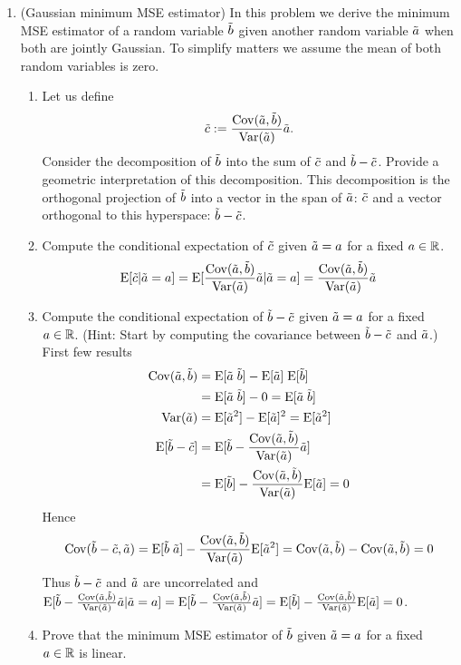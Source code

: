 \documentclass[12pt,twoside]{article}
\begin{document}
\begin{enumerate}
\item (Gaussian minimum MSE estimator) In this problem we derive the minimum MSE estimator of a random variable $\tilde{ b }$ given another random variable $\tilde{ a }$ when both are jointly Gaussian. To simplify matters we assume the mean of both random variables is zero. 
  \begin{enumerate}
  \item Let us define
  \begin{align}
  \rnd{c} := \frac{\cov(\ra,\rb)}{\var(\ra)}\ra.
  \end{align}
  Consider the decomposition of $\tilde{ b }$ into the sum of $\tilde{ c } $ and $\tilde{  b } - \tilde{ c }$. Provide a geometric interpretation of this decomposition. 
  This decomposition is the orthogonal projection of $\tilde{ b }$ into a vector in the span of $\tilde{ a }$: $\tilde{ c }$ and a vector orthogonal to this hyperspace:  $\tilde{  b } - \tilde{ c }$.
  
  \item Compute the conditional expectation of $\tilde{ c } $ given $\tilde{  a }=a$ for a fixed $a \in \mathbb{R}$.
  $$\E[\rnd{c} | \rnd{a}= a] = \E[\frac{\cov(\ra,\rb)}{\var(\ra)}\ra | \ra= a] = \frac{\cov(\ra,\rb)}{\var(\ra)}\ra$$
  
  \item Compute the conditional expectation of $\tilde{  b } - \tilde{ c }$ given $\tilde{  a }=a$ for a fixed $a \in \mathbb{R}$. (Hint: Start by computing the covariance between $\tilde{  b } - \tilde{ c }$ and $\tilde{  a }$.)
  First few results
  \begin{align*}
  	\cov(\ra, \rb)	&=	 \E[\ra \; \rb]	- \E[\ra] \; \E[\rb]	\\
				&=	 \E[\ra \; \rb] - 0 = \E[\ra \; \rb] 		\\
	\var(\ra)		&=	 \E[\ra^2] - \E[\ra]^2 =  \E[\ra^2]		\\
	\E[\rb  - \rnd{c}]	&= 	 \E[ \rb  - \frac{\cov(\ra,\rb)}{\var(\ra)}\ra] \\
				&=	 \E[ \rb] - \frac{\cov(\ra,\rb)}{\var(\ra)} \E[\ra] = 0 
  \end{align*}
  Hence $$\cov(\rb  - \rnd{c}, \ra)   = \E[ \rb  \; \ra] -  \frac{\cov(\ra,\rb)}{\var(\ra)} \E[\ra^2]  = \cov(\ra, \rb) - \cov(\ra, \rb) = 0$$
  Thus  $\tilde{  b }  - \tilde{ c }$ and $\tilde{  a }$ are uncorrelated and $\E[ \rb - \frac{\cov(\ra,\rb)}{\var(\ra)} \ra | \ra= a ] = \E[ \rb - \frac{\cov(\ra,\rb)}{\var(\ra)} \ra] = \E[ \rb] -  \frac{\cov(\ra,\rb)}{\var(\ra)}  \E[\ra] = 0$.
  
  \item Prove that the minimum MSE estimator of $\tilde{ b }$ given $\tilde{  a }=a$ for a fixed $a \in \mathbb{R}$ is linear. 
  

\end{enumerate}
\end{enumerate}
\end{document}
